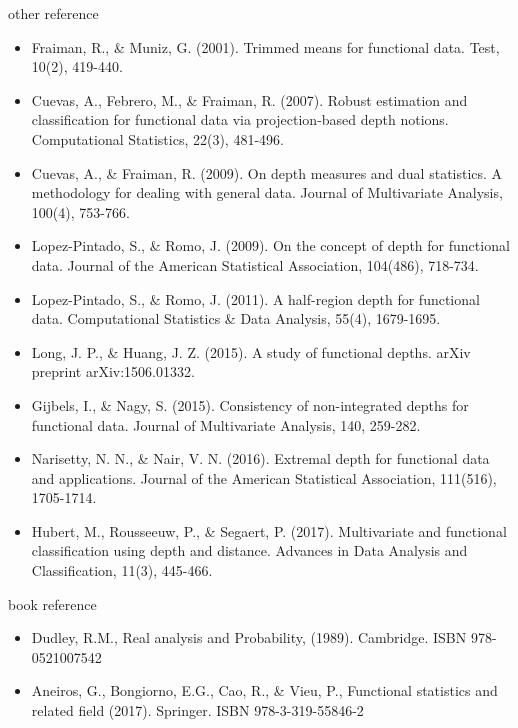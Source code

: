 \documentclass[aspectratio=169,ignorenonframetext,9pt]{beamer}
\theoremstyle{plain}
\theoremstyle{definition}
\begin{document}
\begin{frame}{other reference}
    \begin{itemize}
        \item Fraiman, R., \& Muniz, G. (2001). Trimmed means for functional data. Test, 10(2), 419-440.
        \item Cuevas, A., Febrero, M., \& Fraiman, R. (2007). Robust estimation and classification for functional data via projection-based depth notions. Computational Statistics, 22(3), 481-496.
        \item Cuevas, A., \& Fraiman, R. (2009). On depth measures and dual statistics. A methodology for dealing with general data. Journal of Multivariate Analysis, 100(4), 753-766.
        \item Lopez-Pintado, S., \& Romo, J. (2009). On the concept of depth for functional data. Journal of the American Statistical Association, 104(486), 718-734.
        \item Lopez-Pintado, S., \& Romo, J. (2011). A half-region depth for functional data. Computational Statistics \& Data Analysis, 55(4), 1679-1695.
        \item Long, J. P., \& Huang, J. Z. (2015). A study of functional depths. arXiv preprint arXiv:1506.01332.
        \item Gijbels, I., \& Nagy, S. (2015). Consistency of non-integrated depths for functional data. Journal of Multivariate Analysis, 140, 259-282.
        \item Narisetty, N. N., \& Nair, V. N. (2016). Extremal depth for functional data and applications. Journal of the American Statistical Association, 111(516), 1705-1714.
        \item Hubert, M., Rousseeuw, P., \& Segaert, P. (2017). Multivariate and functional classification using depth and distance. Advances in Data Analysis and Classification, 11(3), 445-466.
    \end{itemize}
\end{frame}

\begin{frame}{book reference}
    \begin{itemize}
        \item Dudley, R.M., Real analysis and Probability, (1989). Cambridge. ISBN 978-0521007542
        \item Aneiros, G., Bongiorno, E.G., Cao, R., \& Vieu, P., Functional statistics and related field (2017). Springer. ISBN 978-3-319-55846-2
    \end{itemize}
\end{frame}
\end{document}

